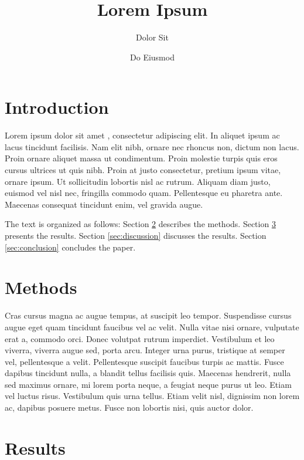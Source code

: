 \documentclass[12pt, aps, prb]{revtex4-2}
\begin{document}
\title{Lorem Ipsum}

\author{Dolor Sit}


\author{Do Eiusmod}

\maketitle

\section{Introduction}

Lorem ipsum dolor sit amet \cite{baroni2001}, consectetur adipiscing elit. In aliquet ipsum ac lacus tincidunt facilisis. Nam elit nibh, ornare nec rhoncus non, dictum non lacus. Proin ornare aliquet massa ut condimentum. Proin molestie turpis quis eros cursus ultrices ut quis nibh. Proin at justo consectetur, pretium ipsum vitae, ornare ipsum. Ut sollicitudin lobortis nisl ac rutrum. Aliquam diam justo, euismod vel nisl nec, fringilla commodo quam. Pellentesque eu pharetra ante. Maecenas consequat tincidunt enim, vel gravida augue.

The text is organized as follows: Section \ref{sec:methods} describes the methods. Section \ref{sec:results} presents the results. Section \ref{sec:discussion} discusses the results. Section \ref{sec:conclusion} concludes the paper.

\section{Methods}
\label{sec:methods}

Cras cursus magna ac augue tempus, at suscipit leo tempor. Suspendisse cursus augue eget quam tincidunt faucibus vel ac velit. Nulla vitae nisi ornare, vulputate erat a, commodo orci. Donec volutpat rutrum imperdiet. Vestibulum et leo viverra, viverra augue sed, porta arcu. Integer urna purus, tristique at semper vel, pellentesque a velit. Pellentesque suscipit faucibus turpis ac mattis. Fusce dapibus tincidunt nulla, a blandit tellus facilisis quis. Maecenas hendrerit, nulla sed maximus ornare, mi lorem porta neque, a feugiat neque purus ut leo. Etiam vel luctus risus. Vestibulum quis urna tellus. Etiam velit nisl, dignissim non lorem ac, dapibus posuere metus. Fusce non lobortis nisi, quis auctor dolor.

\section{Results}
\label{sec:results}
\end{document}
